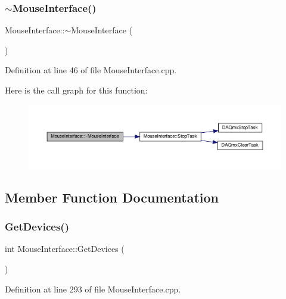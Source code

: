 \subsubsection{\texorpdfstring{$\sim$\+Mouse\+Interface()}{~MouseInterface()}}
{\footnotesize\ttfamily Mouse\+Interface\+::$\sim$\+Mouse\+Interface (\begin{DoxyParamCaption}{ }\end{DoxyParamCaption})}



Definition at line 46 of file Mouse\+Interface.\+cpp.

Here is the call graph for this function\+:
\nopagebreak
\begin{figure}[H]
\begin{center}
\leavevmode
\includegraphics[width=350pt]{class_mouse_interface_a74e418ec1c00dda177cbcdbd3bcf8258_cgraph}
\end{center}
\end{figure}


\subsection{Member Function Documentation}
\mbox{\label{class_mouse_interface_ae6345485870f61952b488823e6b56d76}} 
\subsubsection{\texorpdfstring{Get\+Devices()}{GetDevices()}}
{\footnotesize\ttfamily int Mouse\+Interface\+::\+Get\+Devices (\begin{DoxyParamCaption}{ }\end{DoxyParamCaption})}



Definition at line 293 of file Mouse\+Interface.\+cpp.

